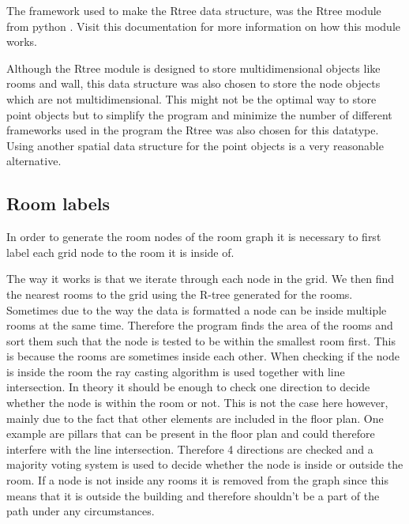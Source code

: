 The framework used to make the Rtree data structure, was the Rtree module from python \cite{rtree_module}. Visit this documentation for more information on how this module works.

Although the Rtree module is designed to store multidimensional objects like rooms and wall, this data structure was also chosen to store the node objects which are not multidimensional.
This might not be the optimal way to store point objects but to simplify the program and minimize the number of different frameworks used in the program the Rtree was also chosen for this datatype. Using another spatial data structure for the point objects is a very reasonable alternative.



\subsection{Room labels}\label{room_labels}
In order to generate the room nodes of the room graph it is necessary to first label each grid node to the room it is inside of. 

The way it works is that we iterate through each node in the grid. We then find the nearest rooms to the grid using the R-tree generated for the rooms. Sometimes due to the way the data is formatted a node can be inside multiple rooms at the same time. Therefore the program finds the area of the rooms and sort them such that the node is tested to be within the smallest room first. This is because the rooms are sometimes inside each other.
When checking if the node is inside the room the ray casting algorithm is used together with line intersection. In theory it should be enough to check one direction to decide whether the node is within the room or not. This is not the case here however, mainly due to the fact that other elements are included in the floor plan. One example are pillars that can be present in the floor plan and could therefore interfere with the line intersection. 
Therefore 4 directions are checked and a majority voting system is used to decide whether the node is inside or outside the room.
If a node is not inside any rooms it is removed from the graph since this means that it is outside the building and therefore shouldn't be a part of the path under any circumstances.

